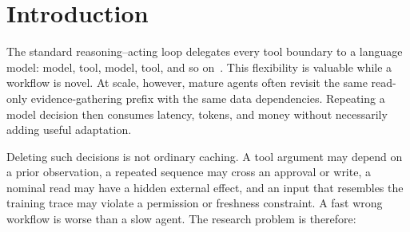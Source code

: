 \providecommand{\appendixonly}[1]{}
\providecommand{\reportstructurelabel}{Roadmap}

\newcommand{\gaccallout}[2]{%
  \par\addvspace{5pt}\noindent
  \begin{tikzpicture}
    \node[draw=gacline!40, line width=0.5pt, fill=gacgrey, rounded corners=1.6pt,
          inner sep=5pt, align=left,
          text width=\dimexpr\linewidth-14pt\relax]
      {\small\textbf{#1}\hspace{0.45em}#2};
  \end{tikzpicture}%
  \par\addvspace{5pt}}

\section{Introduction}

The standard reasoning--acting loop delegates every tool boundary to a language model:
model, tool, model, tool, and so on~\cite{yao2023react}.  This flexibility is valuable
while a workflow is novel.  At scale, however, mature agents often revisit the same
read-only evidence-gathering prefix with the same data dependencies.  Repeating a model
decision then consumes latency, tokens, and money without necessarily adding useful
adaptation.

Deleting such decisions is not ordinary caching.  A tool argument may depend on a prior
observation, a repeated sequence may cross an approval or write, a nominal read may have
a hidden external effect, and an input that resembles the training trace may violate a
permission or freshness constraint.  A fast wrong workflow is worse than a slow agent.
The research problem is therefore:

